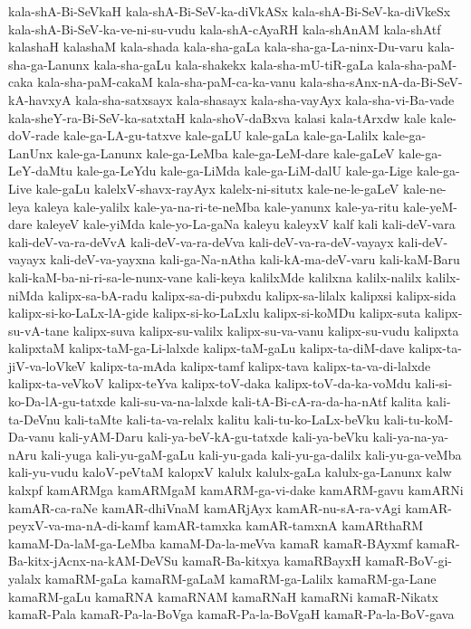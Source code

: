 {kala-shA-Bi-SeVkaH
kala-shA-Bi-SeV-ka-diVkASx
kala-shA-Bi-SeV-ka-diVkeSx
kala-shA-Bi-SeV-ka-ve-ni-su-vudu
kala-shA-cAyaRH
kala-shAnAM
kala-shAtf
kalashaH
kalashaM
kala-shada
kala-sha-gaLa
kala-sha-ga-La-ninx-Du-varu
kala-sha-ga-Lanunx
kala-sha-gaLu
kala-shakekx
kala-sha-mU-tiR-gaLa
kala-sha-paM-caka
kala-sha-paM-cakaM
kala-sha-paM-ca-ka-vanu
kala-sha-sAnx-nA-da-Bi-SeV-kA-havxyA
kala-sha-satxsayx
kala-shasayx
kala-sha-vayAyx
kala-sha-vi-Ba-vade
kala-sheY-ra-Bi-SeV-ka-satxtaH
kala-shoV-daBxva
kalasi
kala-tArxdw
kale
kale-doV-rade
kale-ga-LA-gu-tatxve
kale-gaLU
kale-gaLa
kale-ga-Lalilx
kale-ga-LanUnx
kale-ga-Lanunx
kale-ga-LeMba
kale-ga-LeM-dare
kale-gaLeV
kale-ga-LeY-daMtu
kale-ga-LeYdu
kale-ga-LiMda
kale-ga-LiM-dalU
kale-ga-Lige
kale-ga-Live
kale-gaLu
kalelxV-shavx-rayAyx
kalelx-ni-situtx
kale-ne-le-gaLeV
kale-ne-leya
kaleya
kale-yalilx
kale-ya-na-ri-te-neMba
kale-yanunx
kale-ya-ritu
kale-yeM-dare
kaleyeV
kale-yiMda
kale-yo-La-gaNa
kaleyu
kaleyxV
kalf
kali
kali-deV-vara
kali-deV-va-ra-deVvA
kali-deV-va-ra-deVva
kali-deV-va-ra-deV-vayayx
kali-deV-vayayx
kali-deV-va-yayxna
kali-ga-Na-nAtha
kali-kA-ma-deV-varu
kali-kaM-Baru
kali-kaM-ba-ni-ri-sa-le-nunx-vane
kali-keya
kalilxMde
kalilxna
kalilx-nalilx
kalilx-niMda
kalipx-sa-bA-radu
kalipx-sa-di-pubxdu
kalipx-sa-lilalx
kalipxsi
kalipx-sida
kalipx-si-ko-LaLx-lA-gide
kalipx-si-ko-LaLxlu
kalipx-si-koMDu
kalipx-suta
kalipx-su-vA-tane
kalipx-suva
kalipx-su-valilx
kalipx-su-va-vanu
kalipx-su-vudu
kalipxta
kalipxtaM
kalipx-taM-ga-Li-lalxde
kalipx-taM-gaLu
kalipx-ta-diM-dave
kalipx-ta-jiV-va-loVkeV
kalipx-ta-mAda
kalipx-tamf
kalipx-tava
kalipx-ta-va-di-lalxde
kalipx-ta-veVkoV
kalipx-teYva
kalipx-toV-daka
kalipx-toV-da-ka-voMdu
kali-si-ko-Da-lA-gu-tatxde
kali-su-va-na-lalxde
kali-tA-Bi-cA-ra-da-ha-nAtf
kalita
kali-ta-DeVnu
kali-taMte
kali-ta-va-relalx
kalitu
kali-tu-ko-LaLx-beVku
kali-tu-koM-Da-vanu
kali-yAM-Daru
kali-ya-beV-kA-gu-tatxde
kali-ya-beVku
kali-ya-na-ya-nAru
kali-yuga
kali-yu-gaM-gaLu
kali-yu-gada
kali-yu-ga-dalilx
kali-yu-ga-veMba
kali-yu-vudu
kaloV-peVtaM
kalopxV
kalulx
kalulx-gaLa
kalulx-ga-Lanunx
kalw
kalxpf
kamARMga
kamARMgaM
kamARM-ga-vi-dake
kamARM-gavu
kamARNi
kamAR-ca-raNe
kamAR-dhiVnaM
kamARjAyx
kamAR-nu-sA-ra-vAgi
kamAR-peyxV-va-ma-nA-di-kamf
kamAR-tamxka
kamAR-tamxnA
kamARthaRM
kamaM-Da-laM-ga-LeMba
kamaM-Da-la-meVva
kamaR
kamaR-BAyxmf
kamaR-Ba-kitx-jAcnx-na-kAM-DeVSu
kamaR-Ba-kitxya
kamaRBayxH
kamaR-BoV-gi-yalalx
kamaRM-gaLa
kamaRM-gaLaM
kamaRM-ga-Lalilx
kamaRM-ga-Lane
kamaRM-gaLu
kamaRNA
kamaRNAM
kamaRNaH
kamaRNi
kamaR-Nikatx
kamaR-Pala
kamaR-Pa-la-BoVga
kamaR-Pa-la-BoVgaH
kamaR-Pa-la-BoV-gava
}
